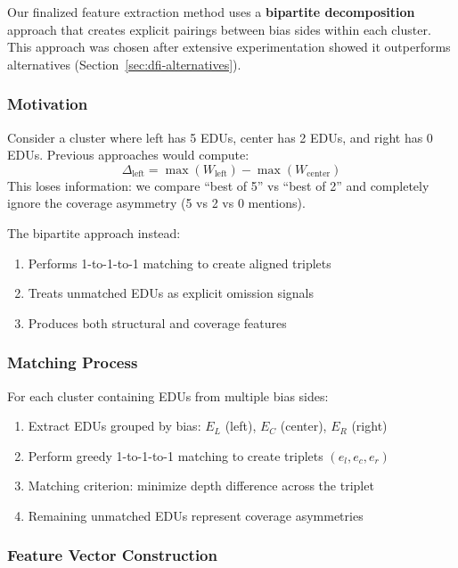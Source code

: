 \documentclass[11pt]{article}
\begin{document}
Our finalized feature extraction method uses a \textbf{bipartite decomposition} approach that creates explicit pairings between bias sides within each cluster. This approach was chosen after extensive experimentation showed it outperforms alternatives (Section~\ref{sec:dfi-alternatives}).

\subsubsection{Motivation}

Consider a cluster where left has 5 EDUs, center has 2 EDUs, and right has 0 EDUs. Previous approaches would compute:
\begin{equation}
\Delta_{\text{left}} = \max(W_{\text{left}}) - \max(W_{\text{center}})
\end{equation}
This loses information: we compare ``best of 5'' vs ``best of 2'' and completely ignore the coverage asymmetry (5 vs 2 vs 0 mentions).

The bipartite approach instead:
\begin{enumerate}
    \item Performs 1-to-1-to-1 matching to create aligned triplets
    \item Treats unmatched EDUs as explicit omission signals
    \item Produces both structural and coverage features
\end{enumerate}

\subsubsection{Matching Process}

For each cluster containing EDUs from multiple bias sides:
\begin{enumerate}
    \item Extract EDUs grouped by bias: $E_L$ (left), $E_C$ (center), $E_R$ (right)
    \item Perform greedy 1-to-1-to-1 matching to create triplets $(e_l, e_c, e_r)$
    \item Matching criterion: minimize depth difference across the triplet
    \item Remaining unmatched EDUs represent coverage asymmetries
\end{enumerate}

\subsubsection{Feature Vector Construction}
\end{document}
